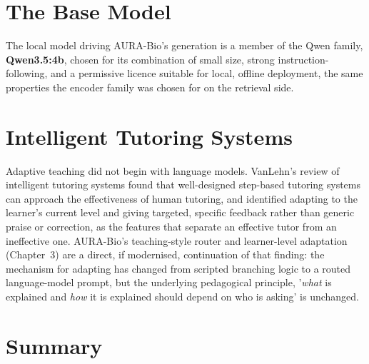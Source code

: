 \section{The Base Model}\label{2.7}

The local model driving AURA-Bio's generation is a member of the Qwen
family, \textbf{Qwen3.5:4b}, chosen for its combination of small size,
strong instruction-following, and a permissive licence suitable for local,
offline deployment, the same properties the encoder family
\cite{devlin2019bert,reimers2019sbert} was chosen for on the retrieval
side.

\section{Intelligent Tutoring Systems}\label{2.8}

Adaptive teaching did not begin with language models. VanLehn's review of
intelligent tutoring systems \cite{vanlehn2011tutoring} found that
well-designed step-based tutoring systems can approach the effectiveness of
human tutoring, and identified adapting to the learner's current level and
giving targeted, specific feedback rather than generic praise or
correction, as the features that separate an effective tutor from an
ineffective one. AURA-Bio's teaching-style router and learner-level
adaptation (Chapter~3) are a direct, if modernised, continuation of that
finding: the mechanism for adapting has changed from scripted branching
logic to a routed language-model prompt, but the underlying pedagogical
principle, '\emph{what} is explained and \emph{how} it is explained
should depend on who is asking' is unchanged.

\section{Summary}\label{2.9}

